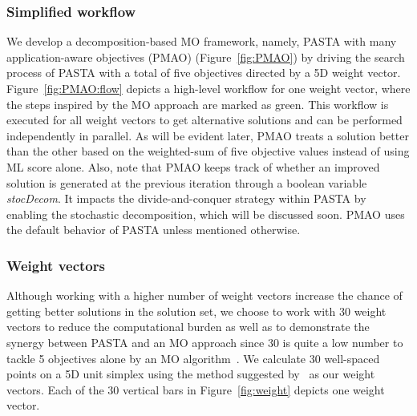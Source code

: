 \documentclass[a4paper,fleqn, review]{cas-dc}
\begin{document}
\subsubsection{Simplified workflow}
We develop a decomposition-based MO framework, namely, PASTA with many application-aware objectives (PMAO) (Figure~\ref{fig:PMAO}) by driving the search process of PASTA with a total of five objectives directed by a 5D weight vector. Figure~\ref{fig:PMAO:flow} depicts a high-level workflow for one weight vector, where the steps inspired by the MO approach are marked as green. This workflow is executed for all weight vectors to get alternative solutions and can be performed independently in parallel. As will be evident later, PMAO treats a solution better than the other based on the weighted-sum of five objective values instead of using ML score alone. Also, note that PMAO keeps track of whether an improved solution is generated at the previous iteration through a boolean variable \textit{stocDecom}. It impacts the divide-and-conquer strategy within PASTA by enabling the stochastic decomposition, which will be discussed soon. PMAO uses the default behavior of PASTA unless mentioned otherwise.

\subsubsection{Weight vectors}
Although working with a higher number of weight vectors increase the chance of getting better solutions in the solution set, we choose to work with 30 weight vectors to reduce the computational burden as well as to demonstrate the synergy between PASTA and an MO approach since 30 is quite a low number to tackle 5 objectives alone by an MO algorithm~\cite{deb2014evolutionary}. We calculate 30 well-spaced points on a 5D unit simplex using the method suggested by~\cite{ref_dirs_energy} as our weight vectors. Each of the 30 vertical bars in Figure~\ref{fig:weight} depicts one weight vector. 
\end{document}
